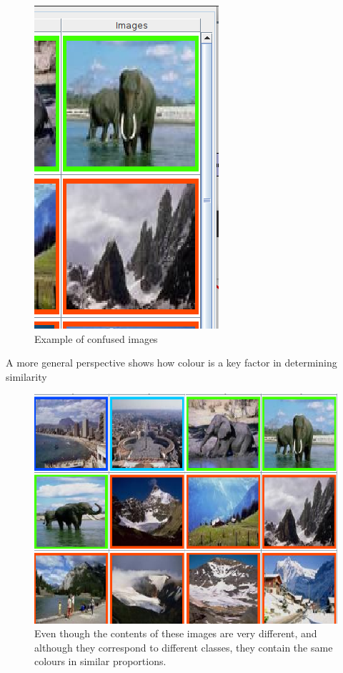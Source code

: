 \documentclass[ 10pt ]{fphw}
\begin{document}
\begin{center}
\begin{figure}[H]
    \centering
	\includegraphics[width=0.5\columnwidth]{elephant and mountain.png} 
	\caption{Example of confused images}
	\label{fig:elephantMt}
	\end{figure}
\end{center}

A more general perspective shows how colour is a key factor in determining similarity

\begin{center}
\begin{figure}[H]
    \centering
	\includegraphics[width=0.75\columnwidth]{greys.png} 
	\caption{Even though the contents of these images are very different, and although they correspond to different classes, they contain the same colours in similar proportions.}
	\label{fig:greys}
	\end{figure}
\end{center}
\end{document}
